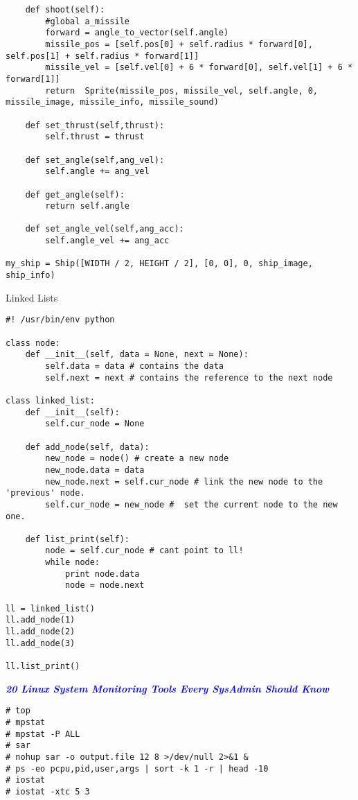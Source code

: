 \documentclass[9pt]{amsart}
\newcommand{\filldots}{\noindent \textbf {\textcolor {blue} {\dotfill}} }
\begin{document}
\begin{multicols}{2}
\begin{lstlisting}
    def shoot(self):
        #global a_missile
        forward = angle_to_vector(self.angle)
        missile_pos = [self.pos[0] + self.radius * forward[0], self.pos[1] + self.radius * forward[1]]
        missile_vel = [self.vel[0] + 6 * forward[0], self.vel[1] + 6 * forward[1]]
        return  Sprite(missile_pos, missile_vel, self.angle, 0, missile_image, missile_info, missile_sound)
    
    def set_thrust(self,thrust):
        self.thrust = thrust
    
    def set_angle(self,ang_vel):
        self.angle += ang_vel
    
    def get_angle(self):
        return self.angle 
        
    def set_angle_vel(self,ang_acc):
        self.angle_vel += ang_acc
        
my_ship = Ship([WIDTH / 2, HEIGHT / 2], [0, 0], 0, ship_image, ship_info)
\end{lstlisting}

Linked Lists
\begin{lstlisting}
#! /usr/bin/env python

class node:
    def __init__(self, data = None, next = None):
        self.data = data # contains the data
        self.next = next # contains the reference to the next node

class linked_list:
    def __init__(self):
        self.cur_node = None

    def add_node(self, data):
        new_node = node() # create a new node
        new_node.data = data
        new_node.next = self.cur_node # link the new node to the 'previous' node.
        self.cur_node = new_node #  set the current node to the new one.

    def list_print(self):
        node = self.cur_node # cant point to ll!
        while node:
            print node.data
            node = node.next

ll = linked_list()
ll.add_node(1)
ll.add_node(2)
ll.add_node(3)

ll.list_print()
\end{lstlisting}

\filldots 

\noindent \textbf {\textcolor {blue} {\em 20 Linux System Monitoring Tools Every SysAdmin Should Know}} 

\noindent {\textcolor {blue} {\em Process Activity Command}} 

\begin{lstlisting}
# top
# mpstat
# mpstat -P ALL
# sar
# nohup sar -o output.file 12 8 >/dev/null 2>&1 &
# ps -eo pcpu,pid,user,args | sort -k 1 -r | head -10
# iostat
# iostat -xtc 5 3
\end{lstlisting}


\end{multicols}
\end{document}
